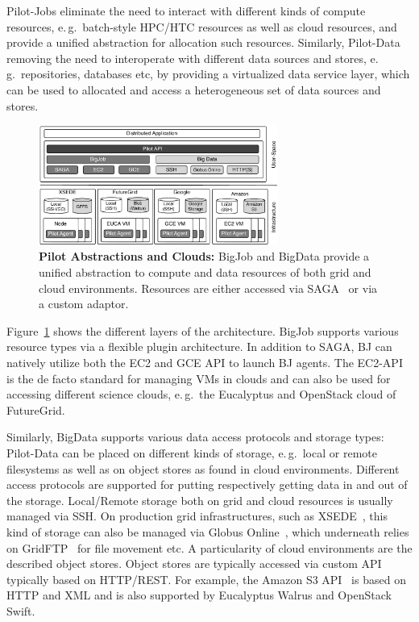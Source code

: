 \documentclass[times]{cpeauth}
\newcommand{\pilotjobs}{Pilot-Jobs\xspace}
\newcommand{\pilotdata}{Pilot-Data\xspace}
\begin{document}
\pilotjobs eliminate the need to interact with different kinds of compute 
resources, e.\,g.\ batch-style HPC/HTC resources as well as cloud resources, 
and provide a unified abstraction for allocation such resources. Similarly, 
\pilotdata removing the need to interoperate with different data sources and 
stores, e.\,g.\ repositories, databases etc, by providing a virtualized data 
service layer, which can be used to allocated and access a heterogeneous set 
of data sources and stores.

\begin{figure}[t]
	\centering
		\includegraphics[width=0.7\textwidth]{figures/cloud_pilot_job.pdf}
	\caption{\textbf{Pilot Abstractions and Clouds:} BigJob and BigData 
	provide a unified abstraction to compute and data resources of both grid 
	and cloud environments. Resources are either accessed via 
	SAGA~\cite{ogf-gfd-90,saga-bliss-pd} or via a custom adaptor.}
	\label{fig:figures_cloud_pilot_job}
\end{figure}

Figure~\ref{fig:figures_cloud_pilot_job} shows the different layers of the
architecture. BigJob supports various resource types via a flexible plugin
architecture. In addition to SAGA, BJ can natively utilize both the EC2 and
GCE API to launch BJ agents. The EC2-API is the de facto standard for managing
VMs in clouds and can also be used for accessing different science clouds,
e.\,g.\ the Eucalyptus and OpenStack cloud of FutureGrid. 

Similarly, BigData supports various data access protocols and storage types:
\pilotdata can be placed on different kinds of storage, e.\,g.\ local or
remote filesystems as well as on object stores as found in cloud environments.
Different access protocols are supported for putting respectively getting data
in and out of the storage. Local/Remote storage both on grid and cloud
resources is usually managed via SSH. On production grid infrastructures, such
as XSEDE~\cite{xsede}, this kind of storage can also be managed via Globus
Online~\cite{10.1109/MIC.2011.64}, which underneath relies on
GridFTP~\cite{ogf-gfd-20} for file movement etc. A particularity of cloud
environments are the described object stores. Object stores are typically
accessed via custom API typically based on HTTP/REST. For example, the Amazon
S3 API~\cite{amazons3api} is based on HTTP and XML and is also supported by
Eucalyptus Walrus and OpenStack Swift.
\end{document}
